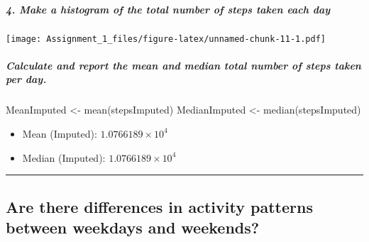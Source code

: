\documentclass[
]{article}
\newenvironment{Shaded}{\begin{snugshade}}{\end{snugshade}}
\newcommand{\AttributeTok}[1]{\textcolor[rgb]{0.77,0.63,0.00}{#1}}
\newcommand{\DecValTok}[1]{\textcolor[rgb]{0.00,0.00,0.81}{#1}}
\newcommand{\FunctionTok}[1]{\textcolor[rgb]{0.00,0.00,0.00}{#1}}
\newcommand{\NormalTok}[1]{#1}
\newcommand{\OtherTok}[1]{\textcolor[rgb]{0.56,0.35,0.01}{#1}}
\newcommand{\SpecialCharTok}[1]{\textcolor[rgb]{0.00,0.00,0.00}{#1}}
\newcommand{\StringTok}[1]{\textcolor[rgb]{0.31,0.60,0.02}{#1}}
\providecommand{\tightlist}{%
  \setlength{\itemsep}{0pt}\setlength{\parskip}{0pt}}
\begin{document}
\hypertarget{make-a-histogram-of-the-total-number-of-steps-taken-each-day-1}{%
\subparagraph{4. Make a histogram of the total number of steps taken
each
day}\label{make-a-histogram-of-the-total-number-of-steps-taken-each-day-1}}

\begin{Shaded}
\end{Shaded}

\texttt{[image: Assignment\_1\_files/figure-latex/unnamed-chunk-11-1.pdf]}

\hypertarget{calculate-and-report-the-mean-and-median-total-number-of-steps-taken-per-day.}{%
\subparagraph{Calculate and report the mean and median total number of
steps taken per
day.}\label{calculate-and-report-the-mean-and-median-total-number-of-steps-taken-per-day.}}

\begin{Shaded}
\begin{Highlighting}[]
\NormalTok{MeanImputed }\OtherTok{\textless{}{-}} \FunctionTok{mean}\NormalTok{(stepsImputed)}
\NormalTok{MedianImputed }\OtherTok{\textless{}{-}} \FunctionTok{median}\NormalTok{(stepsImputed)}
\end{Highlighting}
\end{Shaded}

\begin{itemize}
\tightlist
\item
  Mean (Imputed): \ensuremath{1.0766189\times 10^{4}}
\item
  Median (Imputed): \ensuremath{1.0766189\times 10^{4}}
\end{itemize}

\begin{center}\rule{0.5\linewidth}{0.5pt}\end{center}

\hypertarget{are-there-differences-in-activity-patterns-between-weekdays-and-weekends}{%
\subsection{Are there differences in activity patterns between weekdays
and
weekends?}\label{are-there-differences-in-activity-patterns-between-weekdays-and-weekends}}
\end{document}
